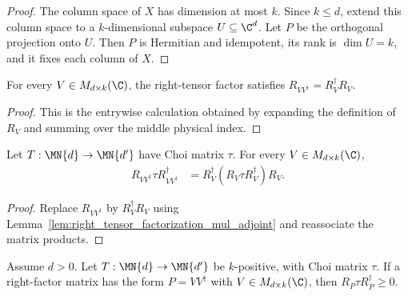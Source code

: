 \begin{proof}
    \leanok
    The column space of $X$ has dimension at most $k$. Since $k\le d$, extend
    this column space to a $k$-dimensional subspace $U\subseteq\C^d$. Let $P$
    be the orthogonal projection onto $U$. Then $P$ is Hermitian and
    idempotent, its rank is $\dim U=k$, and it fixes each column of $X$.
\end{proof}

\begin{lemma}
    \label{lem:right_tensor_factorization_mul_adjoint}
    \leanok
    For every $V\in M_{d\times k}(\C)$, the right-tensor factor satisfies
    $R_{VV^\dagger}=R_V^\dagger R_V$.
\end{lemma}

\begin{proof}
    \leanok
    This is the entrywise calculation obtained by expanding the definition of
    $R_V$ and summing over the middle physical index.
\end{proof}

\begin{lemma}
    \label{lem:factorized_right_tensor_choi_sandwich}
    \leanok
    Let $T:\MN{d}\to\MN{d'}$ have Choi matrix $\tau$. For every
    $V\in M_{d\times k}(\C)$,
    \begin{align}
        R_{VV^\dagger}\tau R_{VV^\dagger}^\dagger
         & =R_V^\dagger(R_V\tau R_V^\dagger)R_V.
        \label{eq:schwarz_factorized_choi_sandwich}
    \end{align}
\end{lemma}

\begin{proof}
    \leanok
    Replace $R_{VV^\dagger}$ by $R_V^\dagger R_V$ using
    Lemma~\ref{lem:right_tensor_factorization_mul_adjoint} and reassociate the
    matrix products.
\end{proof}

\begin{theorem}
    \label{thm:factorized_right_projection_choi_sandwich}
    \leanok
    Assume $d>0$. Let $T:\MN{d}\to\MN{d'}$ be $k$-positive,
    with Choi matrix $\tau$. If a right-factor matrix has the form
    $P=VV^\dagger$ with $V\in M_{d\times k}(\C)$, then
    $R_P\tau R_P^\dagger\geq0$.
\end{theorem}

